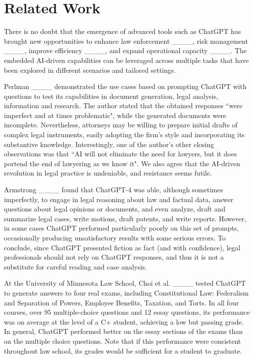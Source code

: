 \section{Related Work}
\label{sec:related-work}
There is no doubt that the emergence of advanced tools such as ChatGPT has brought new opportunities to enhance law enforcement ____, risk management ____, improve efficiency ____, and expand operational capacity ____. The embedded AI-driven capabilities can be leveraged across multiple tasks that have been explored in different scenarios and tailored settings.

Perlman ____ demonstrated the use cases based on prompting ChatGPT with questions to test its capabilities in document generation, legal analysis, information and research. The author stated that the obtained responses ``were imperfect and at times problematic", while the generated documents were incomplete. Nevertheless, attorneys may be willing to prepare initial drafts of complex legal instruments, easily adopting the firm's style and incorporating its substantive knowledge. Interestingly, one of the author's other closing observations was that ``AI will not eliminate the need for lawyers, but it does portend the end of lawyering as we know it". We also agree that the AI-driven revolution in legal practice is undeniable, and resistance seems futile.

Armstrong ____ found that ChatGPT-4 was able, although sometimes imperfectly, to engage in legal reasoning about law and factual data, answer questions about legal opinions or documents, and even analyze, draft and summarize legal cases, write motions, draft patents, and write reports. However, in some cases ChatGPT performed particularly poorly on this set of prompts, occasionally producing unsatisfactory results with some serious errors. To conclude, since ChatGPT presented fiction as fact (and with confidence), legal professionals should not rely on ChatGPT responses, and thus it is not a substitute for careful reading and case analysis. 

At the University of Minnesota Law School, Choi et al. ____ tested ChatGPT to generate answers to four real exams, including Constitutional Law: Federalism and Separation of Powers, Employee Benefits, Taxation, and Torts. In all four courses, over 95 multiple-choice questions and 12 essay questions, its performance was on average at the level of a C+ student, achieving a low but passing grade. In general, ChatGPT performed better on the essay sections of the exams than on the multiple choice questions. Note that if this performance were consistent throughout law school, its grades would be sufficient for a student to graduate.

